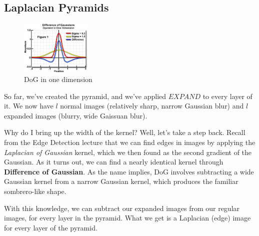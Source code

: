 \documentclass{article}
\begin{document}
\subsection{Laplacian Pyramids}
\begin{figure}
  \begin{center}
    \vspace{-40pt}
    \includegraphics[width=0.30\textwidth]{dog.jpg}
    \vspace{-25pt}
  \end{center}
  \caption{DoG in one dimension}
  \vspace{-20pt}
\end{figure}

So far, we've created the pyramid, and we've applied $EXPAND$ to every layer of it. We now have $l$ normal images (relatively sharp, narrow Gaussian blur) and $l$ expanded images (blurry, wide Gaissuan blur).

Why do I bring up the width of the kernel? Well, let's take a step back. Recall from the Edge Detection lecture that we can find edges in images by applying the \textit{Laplacian of Gaussian} kernel, which we then found as the second gradient of the Gaussian. As it turns out, we can find a nearly identical kernel through \textbf{Difference of Gaussian}. As the name implies, DoG involves subtracting a wide Gaussian kernel from a narrow Gaussian kernel, which produces the familiar sombrero-like shape.

With this knowledge, we can subtract our expanded images from our regular images, for every layer in the pyramid. What we get is a Laplacian (edge) image for every layer of the pyramid.
\end{document}
